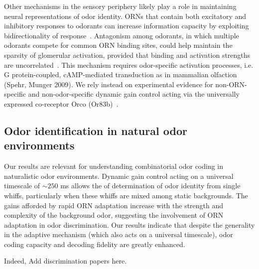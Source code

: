 Other mechanisms in the sensory periphery likely play a role in maintaining neural representations of odor identity. ORNs that contain both excitatory and inhibitory responses to odorants can increase information capacity by exploiting bidirectionality of response~\cite{Cao_Tu_WL}. %
Antagonism among odorants, in which multiple odorants compete for common ORN binding sites, could help maintain the sparsity of glomerular activation, provided that binding and activation strengths are uncorrelated~\cite{reddy2017antagonism}. This mechanism requires odor-specific activation processes, i.e. G protein-coupled, cAMP-mediated transduction as in mammalian olfaction (Spehr, Munger 2009). We rely instead on experimental evidence for non-ORN-specific and non-odor-specific dynamic gain control acting via the universally expressed co-receptor Orco (Or83b)~\cite{srinivas_elife}.  %

\subsection{Odor identification in natural odor environments}

Our results are relevant for understanding combinatorial odor coding in naturalistic odor environments. Dynamic gain control acting on a universal timescale of $\sim 250$ ms allows the of determination of odor identity from single whiffs, particularly when these whiffs are mixed among static backgrounds. The gains afforded by rapid ORN adaptation increase with the strength and complexity of the background odor, suggesting the involvement of ORN adaptation in odor discrimination. %
Our results indicate that despite the generality in the adaptive mechanism (which also acts on a universal timescale), odor coding capacity and decoding fidelity are greatly enhanced. 


Indeed, {\color {blue} Add discrimination papers here}.

